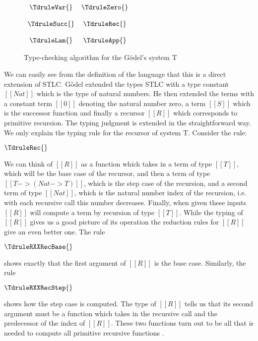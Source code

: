 \begin{figure}
  \begin{center}
    \begin{math}
      \begin{array}{ccc}
        \TdruleVar{} & \TdruleZero{}\\
        & \\
        \TdruleSucc{} & \TdruleRec{}\\ 
        & \\
        \TdruleLam{} & \TdruleApp{}
      \end{array}
    \end{math}
  \end{center}
  \caption{Type-checking algorithm for the G\"odel's system T}
  \label{fig:T_typing}
\end{figure}
We can easily see from the definition of the language that this is a
direct extension of STLC.  G\"odel extended the types STLC with a type
constant $[[Nat]]$ which is the type of natural numbers.  He then
extended the terms with a constant term $[[0]]$ denoting the natural
number zero, a term $[[S]]$ which is the successor function and
finally a recursor $[[R]]$ which corresponds to primitive recursion.  The
typing judgment is extended in the straightforward way.  We only explain the
typing rule for the recursor of system T.  Consider the rule:
\begin{center}
  \begin{math}
    \TdruleRec{}
  \end{math}
\end{center}
We can think of $[[R]]$ as a function which takes in a term of type
$[[T]]$, which will be the base case of the recursor, and then a term
of type $[[T -> (Nat -> T)]]$, which is the step case of the
recursion, and a second term of type $[[Nat]]$, which is the natural
number index of the recursion, i.e. with each recursive call this
number decreases.  Finally, when given these inputs $[[R]]$ will
compute a term by recursion of type $[[T]]$.  While the typing of
$[[R]]$ gives us a good picture of its operation the reduction rules
for $[[R]]$ give an even better one.  The rule
\begin{center}
  \begin{math}
    \TdruleRXXRecBase{}
  \end{math}
\end{center}
shows exactly that the first argument of $[[R]]$ is the base case.  Similarly,
the rule
\begin{center}
  \begin{math}
    \TdruleRXXRecStep{}
  \end{math}
\end{center}
shows how the step case is computed.  The type of $[[R]]$ tells us
that its second argument must be a function which takes in the
recursive call and the predecessor of the index of $[[R]]$.  These two
functions turn out to be all that is needed to compute all primitive
recursive functions \cite{Girard:1989}.

